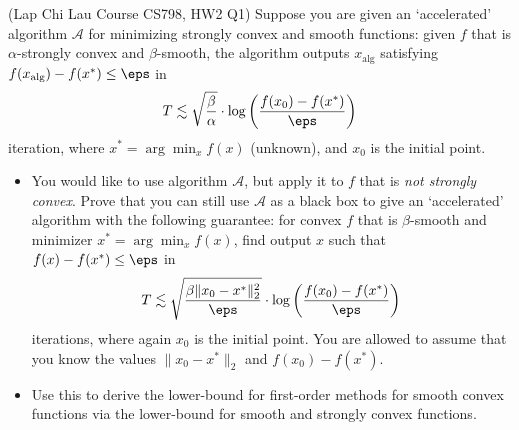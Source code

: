 \documentclass[addpoints,12pt,A4]{exam}
\begin{document}
\begin{questions}
\question (Lap Chi Lau Course CS798, HW2 Q1)
Suppose you are given an `accelerated' algorithm $\mathcal{A}$ for minimizing strongly convex and smooth functions: given $f$ that is $\alpha$-strongly convex and $\beta$-smooth, the algorithm outputs $x_{\text{alg}}$ satisfying $f(x_{\text{alg}}) - f(x^{*}) \leq \eps$ in 
\[ T \lesssim \sqrt{ \frac{\beta}{\alpha}} \cdot  \log \bigg( \frac{f(x_{0}) - f(x^{*})}{\eps} \bigg) \]
iteration, where $x^{*} = \arg\min_{x} f(x)$ (unknown), and $x_{0}$ is the initial point. 

\begin{itemize}
    \item You would like to use algorithm $\mathcal{A}$, but apply it to $f$ that is \emph{not strongly convex}. Prove that you can still use $\mathcal{A}$ as a black box to give an `accelerated' algorithm with the following guarantee: for convex $f$ that is $\beta$-smooth and minimizer $x^{*} = \arg\min_{x} f(x)$, find output $x$ such that $f(x) - f(x^{*}) \leq \eps$ in 
    \[ T \lesssim \sqrt{\frac{\beta \|x_{0} - x^{*}\|_{2}^{2}}{\eps}} \cdot \log \bigg( \frac{f(x_{0}) - f(x^{*})}{\eps} \bigg)   \]
    iterations, where again $x_{0}$ is the initial point. 
    You are allowed to assume that you know the values $\|x_{0} - x^{*}\|_{2}$ and $f(x_{0}) - f(x^{*})$. 

    \item Use this to derive the lower-bound for first-order methods for smooth convex functions via the lower-bound for smooth and strongly convex functions. 
\end{itemize}
\begin{solution}
    
\end{solution}



\end{questions}
\end{document}
